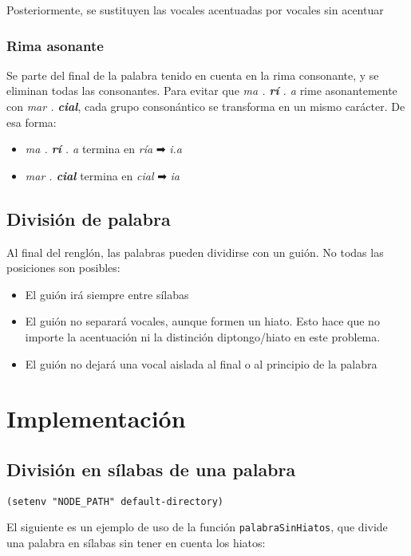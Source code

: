 \documentclass[11pt]{article}
\begin{document}
Posteriormente, se sustituyen las vocales acentuadas por vocales sin acentuar

\subsubsection{Rima asonante}
\label{sec:org0000012}
Se parte del final de la palabra tenido en cuenta en la rima consonante, y se eliminan todas las consonantes. Para evitar que \emph{ma . \textbf{rí} . a} rime asonantemente con \emph{mar . \textbf{cial}}, cada grupo consonántico se transforma en un mismo carácter. De esa forma:
\begin{itemize}
\item \emph{ma . \textbf{rí} . a} termina en \emph{ría} ➡ \emph{i.a}
\item \emph{mar . \textbf{cial}} termina en \emph{cial} ➡ \emph{ia}
\end{itemize}

\subsection{División de palabra}
\label{sec:org0000018}
Al final del renglón, las palabras pueden dividirse con un guión. No todas las posiciones son posibles:
\begin{itemize}
\item El guión irá siempre entre sílabas
\item El guión no separará vocales, aunque formen un hiato. Esto hace que no importe la acentuación ni la distinción diptongo/hiato en este problema.
\item El guión no dejará una vocal aislada al final o al principio de la palabra
\end{itemize}

\section{Implementación}
\label{sec:org0000030}
\subsection{División en sílabas de una palabra}
\label{sec:org0000021}

\lstset{language=Lisp,label= ,caption= ,captionpos=b,numbers=none}
\begin{lstlisting}
(setenv "NODE_PATH" default-directory)
\end{lstlisting}


El siguiente es un ejemplo de uso de la función \texttt{palabraSinHiatos}, que divide una palabra en sílabas sin tener en cuenta los hiatos:
\end{document}
